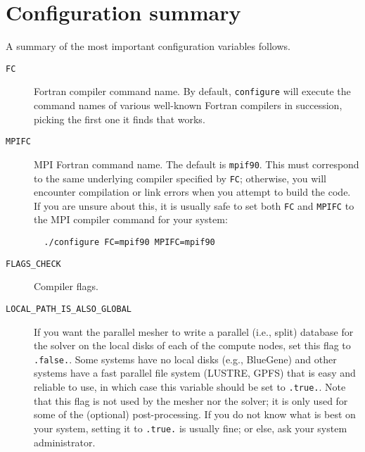 \section{Configuration summary}

\noindent
A summary of the most important configuration variables follows.

\begin{description}
\item [{\texttt{FC}}] Fortran compiler command name. By default, \texttt{configure}
will execute the command names of various well-known Fortran compilers
in succession, picking the first one it finds that works.

\item [{\texttt{MPIFC}}] MPI Fortran command name. The default is \texttt{mpif90}.
This must correspond to the same underlying compiler specified by
\texttt{FC}; otherwise, you will encounter compilation or link errors
when you attempt to build the code. If you are unsure about this,
it is usually safe to set both \texttt{FC} and \texttt{MPIFC} to the
MPI compiler command for your system:
{\small
\begin{verbatim}
  ./configure FC=mpif90 MPIFC=mpif90
\end{verbatim}
}
\end{description}

\begin{description}
\item [{\texttt{FLAGS\_CHECK}}] Compiler flags.

\item [{\texttt{LOCAL\_PATH\_IS\_ALSO\_GLOBAL}}]
If you want the parallel mesher to write a parallel (i.e., split) database for the solver on the
local disks of each of the compute nodes, set this flag to \texttt{.false.}.
Some systems have no local disks
(e.g., BlueGene) and other systems have a fast
parallel file system (LUSTRE, GPFS) that is easy and reliable to use, in which case this variable should be set to
\texttt{.true.}. Note that this flag is not used by the mesher nor
the solver; it is only used for some of the (optional) post-processing.
If you do not know what is best on your system, setting it to \texttt{.true.} is usually fine; or else, ask your system administrator.
\end{description}

